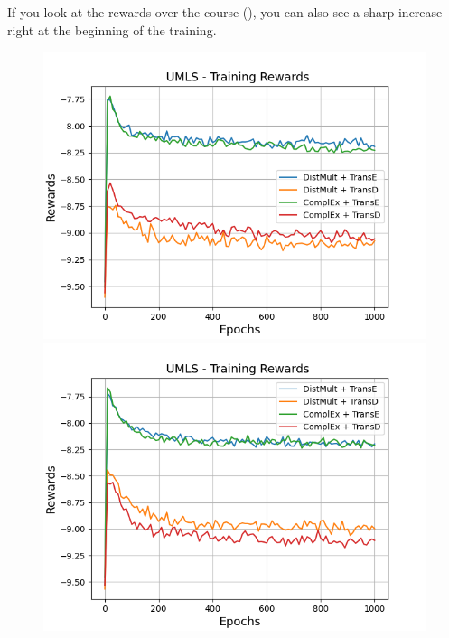 If you look at the rewards over the course (), you can also see a sharp increase right at the beginning of the training.
\begin{figure}
    \centering
    \begin{minipage}{.5\textwidth}
      \centering
      \includegraphics[width=0.9\linewidth]{figures/results/gan_train/not_pretrained/uncertainty/max_distribution/entropy/umls/1k_epochs/uncertainty_umls_rew.png}
    \end{minipage}%
    \begin{minipage}{.5\textwidth}
      \centering
      \includegraphics[width=0.9\linewidth]{figures/results/gan_train/not_pretrained/uncertainty/max_distribution/least_confidence/umls/uncertainty_umls_rew.png}
    \end{minipage}
    \begin{minipage}{.5\textwidth}

\end{minipage}
\end{figure}
